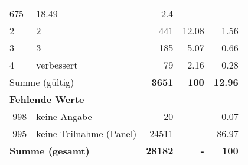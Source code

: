 \begin{longtable}{lXrrr}
       \num{675} &
       \num[round-mode=places,round-precision=2]{18.49} &
         \num[round-mode=places,round-precision=2]{2.4} \\

     2 &
     \multicolumn{1}{X}{ 2   } &


       \num{441} &
       \num[round-mode=places,round-precision=2]{12.08} &
         \num[round-mode=places,round-precision=2]{1.56} \\

     3 &
     \multicolumn{1}{X}{ 3   } &


       \num{185} &
       \num[round-mode=places,round-precision=2]{5.07} &
         \num[round-mode=places,round-precision=2]{0.66} \\

     4 &
     \multicolumn{1}{X}{ verbessert   } &


       \num{79} &
       \num[round-mode=places,round-precision=2]{2.16} &
         \num[round-mode=places,round-precision=2]{0.28} \\
     \midrule
     \multicolumn{2}{l}{Summe (gültig)} &
       \textbf{\num{3651}} &
     \textbf{100} &
       \textbf{\num[round-mode=places,round-precision=2]{12.96}} \\
     \multicolumn{5}{l}{\textbf{Fehlende Werte}}\\
       -998 &
       keine Angabe &
         \num{20} &
        - &
         \num[round-mode=places,round-precision=2]{0.07} \\
       -995 &
       keine Teilnahme (Panel) &
         \num{24511} &
        - &
         \num[round-mode=places,round-precision=2]{86.97} \\
     \midrule
     \multicolumn{2}{l}{\textbf{Summe (gesamt)}} &
          \textbf{\num{28182}} &
        \textbf{-} &
        \textbf{100} \\
     \bottomrule
     \end{longtable}
     
